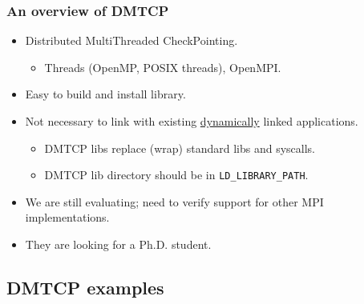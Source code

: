\documentclass[compress]{beamer}
\begin{document}

\begin{frame}
\frametitle{An overview of DMTCP}

\begin{itemize}
\item Distributed MultiThreaded CheckPointing.
  \begin{itemize}
  \item Threads (OpenMP, POSIX threads), OpenMPI.
  \end{itemize}
\item Easy to build and install library.
\item Not necessary to link with existing \ul{dynamically} linked
applications.
  \begin{itemize}
  \item DMTCP libs replace (wrap) standard libs and syscalls.
  \item DMTCP lib directory should be in \texttt{LD\_LIBRARY\_PATH}.
  \end{itemize}
\item We are still evaluating; need to verify support for other MPI
implementations.
\item They are looking for a Ph.D. student.
\end{itemize}



\end{frame}






\subsection{DMTCP examples}   %

\end{document}
